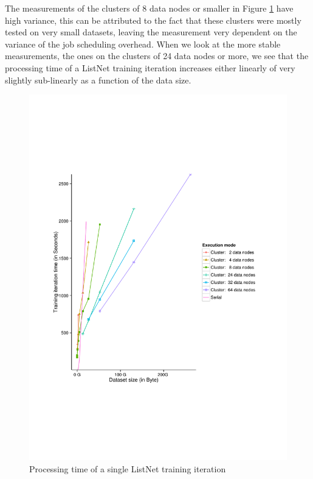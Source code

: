 The measurements of the clusters of 8 data nodes or smaller in Figure \ref{fig:listnet_train_time} have high variance, this can be attributed to the fact that these clusters were mostly tested on very small datasets, leaving the measurement very dependent on the variance of the job scheduling overhead. When we look at the more stable measurements, the ones on the clusters of 24 data nodes or more, we see that the processing time of a ListNet training iteration increases either linearly of very slightly sub-linearly as a function of the data size.\\

\begin{figure}
\centering
\includegraphics[trim=0cm 5cm 0cm 5cm, scale=0.8]{gfx/time_single.pdf}
\caption{Processing time of a single ListNet training iteration}
\label{fig:listnet_train_time}
\end{figure}

